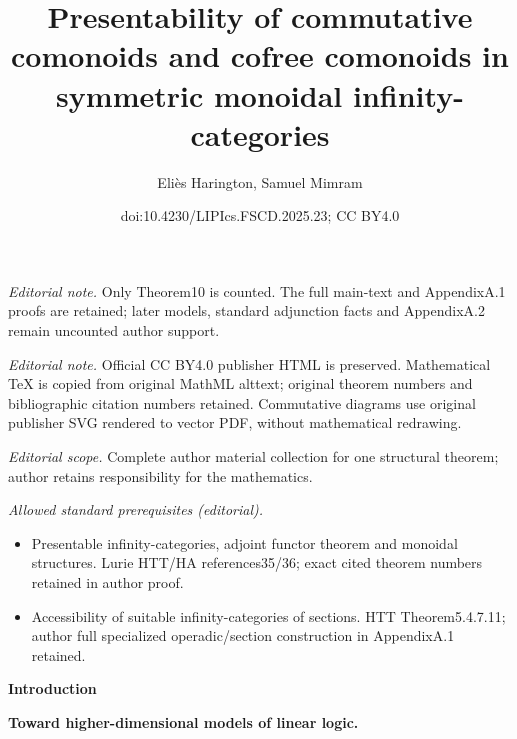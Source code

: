 \documentclass[10pt,a4paper]{article}
\title{Presentability of commutative comonoids and cofree comonoids in symmetric monoidal infinity-categories}
\author{Eliès Harington, Samuel Mimram}
\date{doi:10.4230/LIPIcs.FSCD.2025.23; CC BY4.0}
\begin{document}
\maketitle
\noindent\textit{Editorial note.} Only Theorem10 is counted. The full main-text and AppendixA.1 proofs are retained; later models, standard adjunction facts and AppendixA.2 remain uncounted author support.\par\medskip
\noindent\textit{Editorial note.} Official CC BY4.0 publisher HTML is preserved. Mathematical TeX is copied from original MathML alttext; original theorem numbers and bibliographic citation numbers retained. Commutative diagrams use original publisher SVG rendered to vector PDF, without mathematical redrawing.\par\medskip
\noindent\textit{Editorial scope.} Complete author material collection for one structural theorem; author retains responsibility for the mathematics.\par\medskip
\noindent\textit{Allowed standard prerequisites (editorial).}\begin{itemize}
\item Presentable infinity-categories, adjoint functor theorem and monoidal structures. Lurie HTT/HA references35/36; exact cited theorem numbers retained in author proof.
\item Accessibility of suitable infinity-categories of sections. HTT Theorem5.4.7.11; author full specialized operadic/section construction in AppendixA.1 retained.
\end{itemize}\medskip

 
\par\medskip\noindent\textbf{Introduction}\par
 
 
\par\medskip\noindent\textbf{Toward higher-dimensional models of linear logic.}\par
 
 
\end{document}
